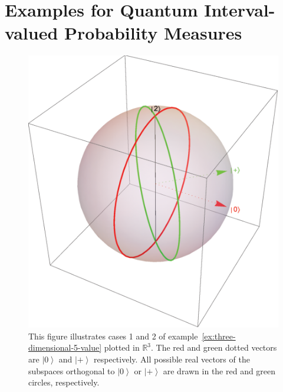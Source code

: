 \documentclass[12pt]{iopart}
\theoremstyle{plain}
\theoremstyle{definition}
\newcommand{\ket}[1]{{\left\vert{#1}\right\rangle}}
\newcommand{\ps}{\texttt{+}}
\begin{document}


\section{Examples for Quantum Interval-valued Probability Measures\label{sec:Examples-for-QuantumIVPM}}

\begin{figure}
\begin{centering}
\includegraphics[scale=0.38]{figureE1} 
\par\end{centering}
\caption{\label{fig:three-dimensional-5-value}This figure illustrates cases
1 and 2 of example~\ref{ex:three-dimensional-5-value} plotted in
$\mathbb{R}^{3}$. The red and green dotted vectors are $\ket{0}$
and $\ket{\ps}$ respectively. All possible real vectors of the subspaces
orthogonal to $\ket{0}$ or $\ket{\ps}$ are drawn in the red and
green circles, respectively.}
\end{figure}
\end{document}
